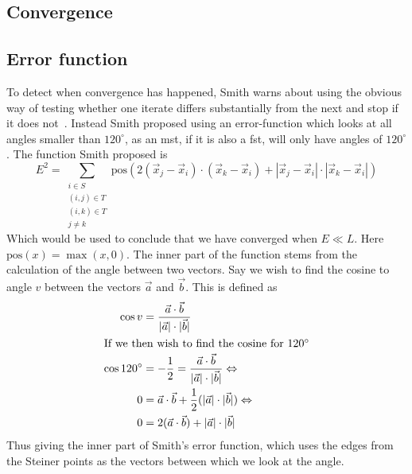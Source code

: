 \subsection{Convergence}
\label{sec:convergence}




\subsection{Error function}
\label{sec:error-function}


To detect when convergence has happened, Smith warns about using the obvious way
of testing whether one iterate differs substantially from the next and stop if
it does not~\cite[p.~151]{Smith1992}.  Instead Smith proposed using an
error-function which looks at all angles smaller than $120^{\circ}$, as an
\gls{mst}, if it is also a \gls{fst}, will only have angles of $120^{\circ}$.
The function Smith proposed is
%
\begin{equation}
  \label{eq:1} E^2 = \sum_{
    \begin{array}{c} i \in S \\ (i,j) \in T \\ (i,k) \in T \\ j \ne k
    \end{array}} \text{pos} (2 (\vec x_j - \vec x_i) \cdot (\vec x_k - \vec x_i)
+ | \vec x_j - \vec x_i | \cdot | \vec x_k - \vec x_i |)
\end{equation}
%
Which would be used to conclude that we have converged when $E \ll L$.  Here
$\text{pos}(x) = \max(x, 0)$.  The inner part of the function stems from the
calculation of the angle between two vectors.  Say we wish to find the cosine to
angle $v$ between the vectors $\vec a$ and $\vec b$.  This is defined as
%
\begin{align}
  \cos v & = \frac{\vec a \cdot \vec b}
    {|\vec a| \cdot |\vec b|} \label{eq:2}                 \\
  \intertext{If we then wish to find the cosine for $120^{\circ}$}
  \cos 120^{\circ}
         & = -\frac{1}{2} = \frac{\vec a \cdot \vec b}
    {|\vec a| \cdot |\vec b|} \Leftrightarrow \label{eq:3} \\
  0      & = \vec a \cdot \vec b + \frac{1}{2}
    (|\vec a| \cdot |\vec b|) \Leftrightarrow \label{eq:4} \\
  0      & = 2 (\vec a \cdot \vec b) + |\vec a| \cdot |\vec b| \label{eq:5}
\end{align}
%
Thus giving the inner part of Smith's error function, which uses the edges from
the Steiner points as the vectors between which we look at the angle.

